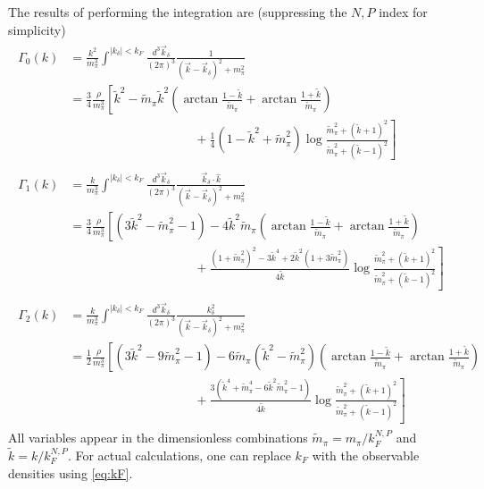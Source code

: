 \documentclass[%
 preprint,
 amsmath,amssymb,
 aps,
]{revtex4-1}
\begin{document}
The results of performing the integration are (suppressing the $N,P$ index for simplicity)
 \begin{align}
 \begin{split}
 \Gamma_{0}(k)&=\frac{k^2}{m_\pi^3}\int^{|k_\delta|<k_F}\frac{d^3\vec{k}_\delta}{(2\pi)^3} \frac{1}{(\vec{k}-\vec{k}_\delta)^2+m_\pi^2} \\
 &=\frac{3}{4}\frac{\rho}{m_\pi^3}\left[  \tilde{k}^2 -\tilde{m}_\pi\tilde{k}^2\left(\arctan\frac{1-\tilde{k}}{\tilde{m}_\pi}+\arctan\frac{1+\tilde{k}}{\tilde{m}_\pi}\right)\right. \\
 &\left.\qquad\qquad\qquad\qquad\qquad+\frac{1}{4}\left(1-\tilde{k}^2+\tilde{m}_\pi^2\right)\log\frac{\tilde{m}_\pi^2+(\tilde{k}+1)^2}{\tilde{m}_\pi^2+(\tilde{k}-1)^2} \right]
 \end{split} \\
  \begin{split}
 \Gamma_{1}(k)&=\frac{k}{m_\pi^3}\int^{|k_\delta|<k_F}\frac{d^3\vec{k}_\delta}{(2\pi)^3} \frac{\vec{k}_\delta\cdot\hat{k}}{(\vec{k}-\vec{k}_\delta)^2+m_\pi^2} \\
 &=\frac{3}{4}\frac{\rho}{m_\pi^3}\left[  (3\tilde{k}^2-\tilde{m}_\pi^2-1)-4\tilde{k}^2\tilde{m}_\pi\left(\arctan\frac{1-\tilde{k}}{\tilde{m}_\pi}+\arctan\frac{1+\tilde{k}}{\tilde{m}_\pi}\right)\right. \\
 &\left.\qquad\qquad\qquad\qquad\qquad+\frac{(1+\tilde{m}_\pi^2)^2-3\tilde{k}^4+2\tilde{k}^2(1+3\tilde{m}_\pi^2)}{4\tilde{k}}\log\frac{\tilde{m}_\pi^2+(\tilde{k}+1)^2}{\tilde{m}_\pi^2+(\tilde{k}-1)^2} \right]
 \end{split} \\
  \begin{split}
 \Gamma_{2}(k)&=\frac{k}{m_\pi^3}\int^{|k_\delta|<k_F}\frac{d^3\vec{k}_\delta}{(2\pi)^3} \frac{k_\delta^2}{(\vec{k}-\vec{k}_\delta)^2+m_\pi^2} \\
 &=\frac{1}{2}\frac{\rho}{m_\pi^3}\left[  (3\tilde{k}^2-9\tilde{m}_\pi^2-1)-6\tilde{m}_\pi(\tilde{k}^2-\tilde{m}_\pi^2)\left(\arctan\frac{1-\tilde{k}}{\tilde{m}_\pi}+\arctan\frac{1+\tilde{k}}{\tilde{m}_\pi}\right)\right. \\
 &\left.\qquad\qquad\qquad\qquad\qquad+\frac{3\left(\tilde{k}^4+\tilde{m}_\pi^4-6\tilde{k}^2\tilde{m}_\pi^2-1\right)}{4\tilde{k}}\log\frac{\tilde{m}_\pi^2+(\tilde{k}+1)^2}{\tilde{m}_\pi^2+(\tilde{k}-1)^2} \right]
 \end{split} 
  \end{align}
All variables appear in the dimensionless combinations $\tilde{m}_\pi=m_\pi/k_F^{N,P}$ and $\tilde{k}=k/k_F^{N,P}$. For actual calculations, one can replace $k_F$ with the observable densities using \eqref{eq:kF}.
\end{document}
